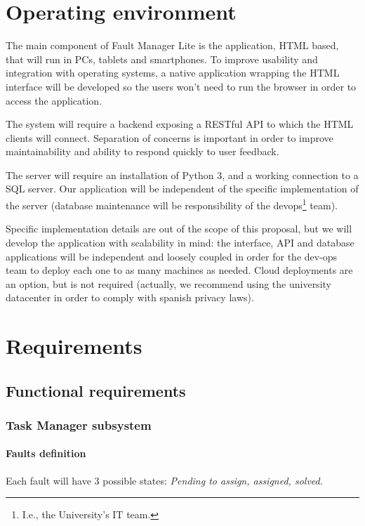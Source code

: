 \section{Operating environment}

The main component of Fault Manager Lite is the application, HTML based, that will run in PCs, tablets and smartphones. To improve usability and integration with operating systems, a native application wrapping the HTML interface will be developed so the users won't need to run the browser in order to access the application.

The system will require a backend exposing a RESTful API to which the HTML clients will connect. Separation of concerns is important in order to improve maintainability and ability to respond quickly to user feedback.

The server will require an installation of Python 3, and a working connection to a SQL server. Our application will be independent of the specific implementation of the server (database maintenance will be responsibility of the devops\footnote{I.e., the University's IT team.} team).

Specific implementation details are out of the scope of this proposal, but we will develop the application with scalability in mind: the interface, API and database applications will be independent and loosely coupled in order for the dev-ops team to deploy each one to as many machines as needed. Cloud deployments are an option, but is not required (actually, we recommend using the university datacenter in order to comply with spanish privacy laws).

\section{Requirements}

\subsection{Functional requirements}

\subsubsection{Task Manager subsystem}

\paragraph{Faults definition} Each fault will have 3 possible states: \textit{Pending to assign, assigned, solved}.

